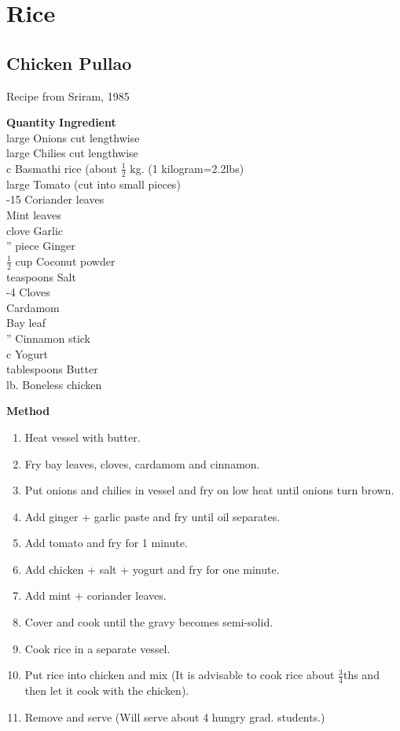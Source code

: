 \chapter{Rice}

\section{Chicken Pullao}
  Recipe from Sriram, 1985

\begin{tabbing}
\hspace{1.0cm}  \={\bf Quantity}   \hspace{3.0cm} \={\bf Ingredient}\\
 large \>Onions cut lengthwise\\
 large \>Chilies cut lengthwise\\
 c 	  \>Basmathi rice (about $\frac{1}{2}$ kg. (1 kilogram=2.2lbs)\\
 large  \>Tomato (cut into small pieces)\\
-15   \>Coriander leaves\\
      \>Mint leaves\\
 clove \>Garlic \\
'' piece\> Ginger \\
\>$\frac{1}{2}$ cup   \>Coconut powder\\
 teaspoons   \>Salt\\
-4  	\>Cloves\\
    	\>Cardamom\\
   	\>Bay leaf\\
''   \>Cinnamon stick\\
 c   \>Yogurt\\
 tablespoons   \>Butter\\
 lb.	\> Boneless chicken\\
\end{tabbing}

{\bf Method}
\begin{enumerate}
   \item Heat vessel with butter.
   \item Fry bay leaves, cloves, cardamom and cinnamon.
   \item Put  onions  and  chilies in vessel and fry on low heat until onions turn
      brown.
   \item Add ginger + garlic paste and fry until oil separates.
   \item Add tomato and fry for 1 minute.
   \item Add chicken + salt + yogurt and fry for one minute.
   \item Add mint + coriander leaves.
   \item Cover and cook until the gravy becomes semi-solid.
   \item Cook rice in a separate vessel.
  \item Put rice into chicken and mix (It is advisable to  cook  rice  about
      $\frac{3}{4}$ths and then let it cook with the chicken).
  \item Remove and serve (Will serve about 4 hungry grad. students.)
\end{enumerate}


